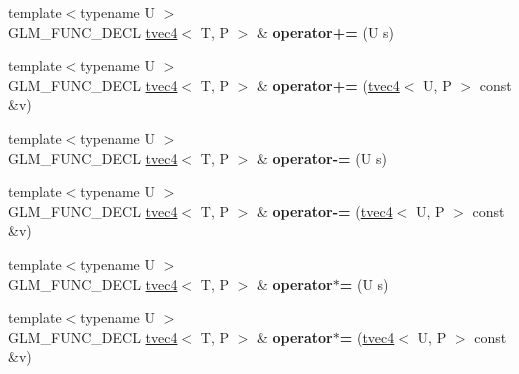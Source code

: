 \begin{DoxyCompactItemize}
\item 
\hypertarget{structglm_1_1detail_1_1tvec4_a2698ceff8c17d81e180dfd6dd2f7031e}{{\footnotesize template$<$typename U $>$ }\\G\-L\-M\-\_\-\-F\-U\-N\-C\-\_\-\-D\-E\-C\-L \hyperlink{structglm_1_1detail_1_1tvec4}{tvec4}$<$ T, P $>$ \& {\bfseries operator+=} (U s)}\label{structglm_1_1detail_1_1tvec4_a2698ceff8c17d81e180dfd6dd2f7031e}

\item 
\hypertarget{structglm_1_1detail_1_1tvec4_a97b781953b588e8a5063f52ada786bdb}{{\footnotesize template$<$typename U $>$ }\\G\-L\-M\-\_\-\-F\-U\-N\-C\-\_\-\-D\-E\-C\-L \hyperlink{structglm_1_1detail_1_1tvec4}{tvec4}$<$ T, P $>$ \& {\bfseries operator+=} (\hyperlink{structglm_1_1detail_1_1tvec4}{tvec4}$<$ U, P $>$ const \&v)}\label{structglm_1_1detail_1_1tvec4_a97b781953b588e8a5063f52ada786bdb}

\item 
\hypertarget{structglm_1_1detail_1_1tvec4_abac89afd5c01b6f6b87d826255edf0dd}{{\footnotesize template$<$typename U $>$ }\\G\-L\-M\-\_\-\-F\-U\-N\-C\-\_\-\-D\-E\-C\-L \hyperlink{structglm_1_1detail_1_1tvec4}{tvec4}$<$ T, P $>$ \& {\bfseries operator-\/=} (U s)}\label{structglm_1_1detail_1_1tvec4_abac89afd5c01b6f6b87d826255edf0dd}

\item 
\hypertarget{structglm_1_1detail_1_1tvec4_ad5f9a3e666a750055fa074ba58c67d09}{{\footnotesize template$<$typename U $>$ }\\G\-L\-M\-\_\-\-F\-U\-N\-C\-\_\-\-D\-E\-C\-L \hyperlink{structglm_1_1detail_1_1tvec4}{tvec4}$<$ T, P $>$ \& {\bfseries operator-\/=} (\hyperlink{structglm_1_1detail_1_1tvec4}{tvec4}$<$ U, P $>$ const \&v)}\label{structglm_1_1detail_1_1tvec4_ad5f9a3e666a750055fa074ba58c67d09}

\item 
\hypertarget{structglm_1_1detail_1_1tvec4_a938a7911eafdf499c4c4461255343d93}{{\footnotesize template$<$typename U $>$ }\\G\-L\-M\-\_\-\-F\-U\-N\-C\-\_\-\-D\-E\-C\-L \hyperlink{structglm_1_1detail_1_1tvec4}{tvec4}$<$ T, P $>$ \& {\bfseries operator$\ast$=} (U s)}\label{structglm_1_1detail_1_1tvec4_a938a7911eafdf499c4c4461255343d93}

\item 
\hypertarget{structglm_1_1detail_1_1tvec4_a37ac1922f8feef122bfa57800b4124f4}{{\footnotesize template$<$typename U $>$ }\\G\-L\-M\-\_\-\-F\-U\-N\-C\-\_\-\-D\-E\-C\-L \hyperlink{structglm_1_1detail_1_1tvec4}{tvec4}$<$ T, P $>$ \& {\bfseries operator$\ast$=} (\hyperlink{structglm_1_1detail_1_1tvec4}{tvec4}$<$ U, P $>$ const \&v)}\label{structglm_1_1detail_1_1tvec4_a37ac1922f8feef122bfa57800b4124f4}


\end{DoxyCompactItemize}
